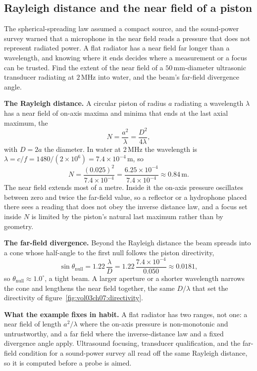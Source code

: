 \subsection{Rayleigh distance and the near field of a piston}

The spherical-spreading law assumed a compact source, and the sound-power
survey warned that a microphone in the near field reads a pressure that does
not represent radiated power. A flat radiator has a near field far longer
than a wavelength, and knowing where it ends decides where a measurement or
a focus can be trusted. Find the extent of the near field of a
$50\,\si{\milli\meter}$-diameter ultrasonic transducer radiating at
$2\,\si{\mega\hertz}$ into water, and the beam's far-field divergence
angle.

\textbf{The Rayleigh distance.} A circular piston of radius $a$ radiating a
wavelength $\lambda$ has a near field of on-axis maxima and minima that ends
at the last axial maximum, the 
\[
N = \frac{a^2}{\lambda} = \frac{D^2}{4\lambda},
\]
with $D=2a$ the diameter. In water at $2\,\si{\mega\hertz}$ the wavelength is
$\lambda = c/f = 1480/(2\times 10^{6}) = 7.4\times 10^{-4}\,\si{\meter}$, so
\[
N = \frac{(0.025)^2}{7.4\times 10^{-4}}
  = \frac{6.25\times 10^{-4}}{7.4\times 10^{-4}}
  \approx 0.84\,\si{\meter}.
\]
The near field extends most of a metre. Inside it the on-axis pressure
oscillates between zero and twice the far-field value, so a reflector or a
hydrophone placed there sees a reading that does not obey the inverse
distance law, and a focus set inside $N$ is limited by the piston's natural
last maximum rather than by geometry.

\textbf{The far-field divergence.} Beyond the Rayleigh distance the beam
spreads into a cone whose half-angle to the first null follows the piston
directivity,
\[
\sin\theta_{\text{null}} = 1.22\,\frac{\lambda}{D}
                        = 1.22\,\frac{7.4\times 10^{-4}}{0.050}
                        \approx 0.0181,
\]
so $\theta_{\text{null}}\approx 1.0^{\circ}$, a tight beam. A larger
aperture or a shorter wavelength narrows the cone and lengthens the near
field together, the same $D/\lambda$ that set the directivity of
figure~\ref{fig:vol03ch07:directivity}.

\textbf{What the example fixes in habit.} A flat radiator has two ranges,
not one: a near field of length $a^2/\lambda$ where the on-axis pressure is
non-monotonic and untrustworthy, and a far field where the inverse-distance
law and a fixed divergence angle apply. Ultrasound focusing, transducer
qualification, and the far-field condition for a sound-power survey all read
off the same Rayleigh distance, so it is computed before a probe is aimed.

